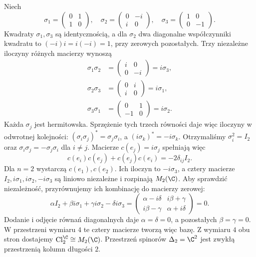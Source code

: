 \begin{przyklad}
\label{prz:lin31-pauli}
Niech
\[
 \sigma_1=\begin{pmatrix}0&1\\1&0\end{pmatrix},
 \quad
 \sigma_2=\begin{pmatrix}0&-i\\i&0\end{pmatrix},
 \quad
 \sigma_3=\begin{pmatrix}1&0\\0&-1\end{pmatrix}.
\]
Kwadraty $\sigma_1,\sigma_3$ są identycznością,
a dla $\sigma_2$ dwa diagonalne współczynniki kwadratu
to $(-i)i=i(-i)=1$, przy zerowych pozostałych.
Trzy niezależne iloczyny różnych macierzy wynoszą
\[
 \begin{aligned}
 \sigma_1\sigma_2&=\begin{pmatrix}i&0\\0&-i\end{pmatrix}
                  =i\sigma_3,\\
 \sigma_2\sigma_3&=\begin{pmatrix}0&i\\i&0\end{pmatrix}
                  =i\sigma_1,\\
 \sigma_3\sigma_1&=\begin{pmatrix}0&1\\-1&0\end{pmatrix}
                  =i\sigma_2.
 \end{aligned}
\]
Każda $\sigma_j$ jest hermitowska.
Sprzężenie tych trzech równości daje więc iloczyny w odwrotnej
kolejności: $(\sigma_i\sigma_j)^*=\sigma_j\sigma_i$,
a $(i\sigma_k)^*=-i\sigma_k$.
Otrzymaliśmy $\sigma_i^2=I_2$ oraz
$\sigma_i\sigma_j=-\sigma_j\sigma_i$ dla $i\ne j$.
Macierze $c(e_j)=i\sigma_j$ spełniają więc
\[
 c(e_i)c(e_j)+c(e_j)c(e_i)=-2\delta_{ij}I_2.
\]
Dla $n=2$ wystarczą $c(e_1),c(e_2)$.
Ich iloczyn to $-i\sigma_3$, a cztery macierze
$I_2,i\sigma_1,i\sigma_2,-i\sigma_3$
są liniowo niezależne i rozpinają
$M_2(\C)$. Aby sprawdzić niezależność, przyrównujemy
ich kombinację do macierzy zerowej:
\[
 \alpha I_2+\beta i\sigma_1+\gamma i\sigma_2-\delta i\sigma_3
 =\begin{pmatrix}
   \alpha-i\delta&i\beta+\gamma\\
   i\beta-\gamma&\alpha+i\delta
  \end{pmatrix}=0.
\]
Dodanie i odjęcie równań diagonalnych daje
$\alpha=\delta=0$, a pozostałych $\beta=\gamma=0$.
W przestrzeni wymiaru $4$ te cztery macierze tworzą więc bazę.
Z wymiaru $4$ obu stron dostajemy
$\operatorname{Cl}^{\C}_2\cong M_2(\C)$.
Przestrzeń spinorów $\Delta_2=\C^2$
jest zwykłą przestrzenią kolumn długości $2$.
\end{przyklad}

